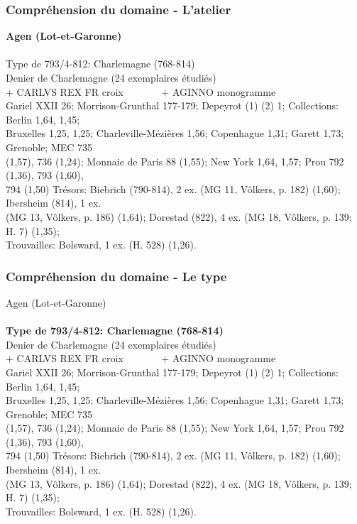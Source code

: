 \documentclass[10pt, compress]{beamer}
\begin{document}
\begin{frame}[fragile]
  \frametitle{Compréhension du domaine - L'atelier}
  \begin{scriptsize}
\textbf{Agen (Lot-et-Garonne)}\\~\\
\textcolor{light_gray}{
Type de 793/4-812: Charlemagne (768-814)\\
Denier de Charlemagne (24 exemplaires étudiés)\\
+ CARLVS REX FR croix~~~~~~~ + AGINNO monogramme\\
Gariel XXII 26; Morrison-Grunthal 177-179; Depeyrot (1) (2) 1; Collections: Berlin 1,64, 1,45; \\
Bruxelles 1,25, 1,25; Charleville-Mézières 1,56; Copenhague 1,31; Garett 1,73; Grenoble; MEC 735 \\
(1,57), 736 (1,24); Monnaie de Paris 88 (1,55); New York 1,64, 1,57; Prou 792 (1,36), 793 (1,60), \\
794 (1,50) Trésors: Biebrich (790-814), 2 ex. (MG 11, Vôlkers, p. 182) (1,60); Ibersheim (814), 1 ex. \\
(MG 13, Vôlkers, p. 186) (1,64); Dorestad (822), 4 ex. (MG 18, Vôlkers, p. 139; H. 7) (1,35); \\Trouvailles: Bolsward, 1 ex. (H. 528) (1,26).
} 
\end{scriptsize}
    
\end{frame}

\begin{frame}[fragile]
  \frametitle{Compréhension du domaine - Le type}
  \begin{scriptsize}
\textcolor{light_gray}{Agen (Lot-et-Garonne)}\\~\\

\textbf{Type de 793/4-812: Charlemagne (768-814)}\\
\textcolor{light_gray}{
Denier de Charlemagne (24 exemplaires étudiés)\\
+ CARLVS REX FR croix~~~~~~~ + AGINNO monogramme\\
Gariel XXII 26; Morrison-Grunthal 177-179; Depeyrot (1) (2) 1; Collections: Berlin 1,64, 1,45; \\
Bruxelles 1,25, 1,25; Charleville-Mézières 1,56; Copenhague 1,31; Garett 1,73; Grenoble; MEC 735 \\
(1,57), 736 (1,24); Monnaie de Paris 88 (1,55); New York 1,64, 1,57; Prou 792 (1,36), 793 (1,60), \\
794 (1,50) Trésors: Biebrich (790-814), 2 ex. (MG 11, Vôlkers, p. 182) (1,60); Ibersheim (814), 1 ex. \\
(MG 13, Vôlkers, p. 186) (1,64); Dorestad (822), 4 ex. (MG 18, Vôlkers, p. 139; H. 7) (1,35); \\Trouvailles: Bolsward, 1 ex. (H. 528) (1,26).
} 
    \end{scriptsize}
    
\end{frame}
\end{document}

